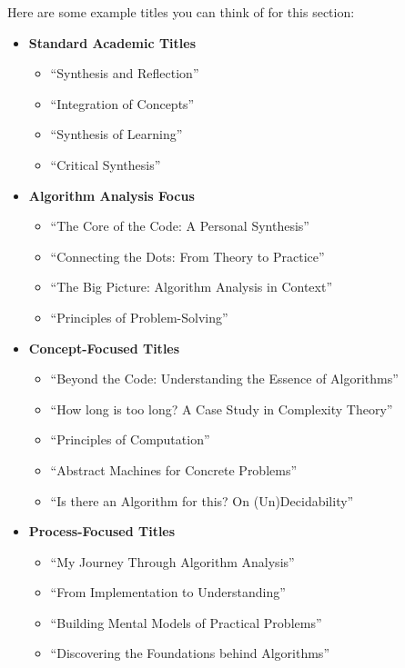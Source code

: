 \documentclass{article}
\theoremstyle{theorem}
\theoremstyle{definition}
\theoremstyle{remark}
\begin{document}
Here are some example titles you can think of for this section:

\begin{itemize}
\item \textbf{Standard Academic Titles}
  \begin{itemize}
  \item ``Synthesis and Reflection''
  \item ``Integration of Concepts''
  \item ``Synthesis of Learning''
  \item ``Critical Synthesis''
  \end{itemize}

\item \textbf{Algorithm Analysis Focus}
  \begin{itemize}
  \item ``The Core of the Code: A Personal Synthesis''
  \item ``Connecting the Dots: From Theory to Practice''
  \item ``The Big Picture: Algorithm Analysis in Context''
  \item ``Principles of Problem-Solving''
  \end{itemize}

\item \textbf{Concept-Focused Titles}
  \begin{itemize}
  \item ``Beyond the Code: Understanding the Essence of Algorithms''
  \item ``How long is too long? A Case Study in Complexity Theory''
  \item ``Principles of Computation''
  \item ``Abstract Machines for Concrete Problems''
  \item ``Is there an Algorithm for this? On (Un)Decidability''
  \end{itemize}

\item \textbf{Process-Focused Titles}
  \begin{itemize}
  \item ``My Journey Through Algorithm Analysis''
  \item ``From Implementation to Understanding''
  \item ``Building Mental Models of Practical Problems''
  \item ``Discovering the Foundations behind Algorithms''
  \end{itemize}
\end{itemize}
\end{document}
